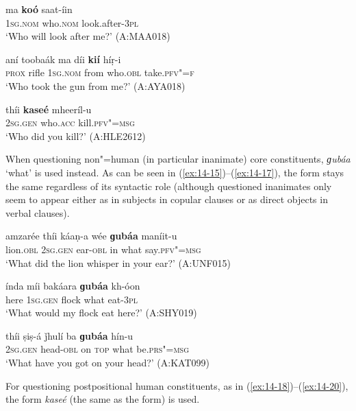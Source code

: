 \begin{exe}
\ex
\label{ex:14-12}
\gll ma \textbf{koó} saat-íin \\
\textsc{1sg}.\textsc{nom} who.\textsc{nom} look.after-\textsc{3pl} \\
\glt `Who will look after me?' (A:MAA018)

\ex
\label{ex:14-13}
\gll aní toobaák ma díi \textbf{kií} híṛ-i\\
\textsc{prox} rifle \textsc{1sg.nom} from who.\textsc{obl} take.\textsc{pfv"=f} \\
\glt `Who took the gun from me?' (A:AYA018)

\ex
\label{ex:14-14}
\gll thíi \textbf{kaseé} mheeríl-u \\
\textsc{2sg.gen} who.\textsc{acc} kill.\textsc{pfv"=msg} \\
\glt `Who did you kill?' (A:HLE2612)
\end{exe}

When questioning non"=human (in particular inanimate) core constituents, \textit{ɡubáa} `what' is used instead. As can be seen in (\ref{ex:14-15})--(\ref{ex:14-17}), the form stays the same regardless of its syntactic role (although questioned inanimates only seem to appear either as in subjects in copular clauses or as direct objects in verbal clauses).

\begin{exe}
\ex
\label{ex:14-15}
\gll amzarée thíi káaṇ-a wée \textbf{ɡubáa} maníit-u \\
lion.\textsc{obl} \textsc{2sg.gen} ear-\textsc{obl} in what say.\textsc{pfv"=msg} \\
\glt `What did the lion whisper in your ear?' (A:UNF015)

\ex
\label{ex:14-16}
\gll índa míi bakáara \textbf{ɡubáa} kh-óon \\
here \textsc{1sg.gen} flock what eat-\textsc{3pl} \\
\glt `What would my flock eat here?' (A:SHY019)

\ex
\label{ex:14-17}
\gll thíi ṣiṣ-á ǰhulí ba \textbf{ɡubáa} hín-u \\
\textsc{2sg.gen} head-\textsc{obl} on \textsc{top} what be.\textsc{prs"=msg} \\
\glt `What have you got on your head?' (A:KAT099)
\end{exe}

 For questioning postpositional human constituents, as in (\ref{ex:14-18})--(\ref{ex:14-20}), the  form \textit{kaseé} (the same as the  form) is used.

